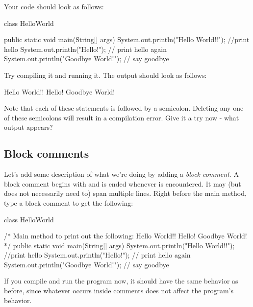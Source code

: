 Your code should look as follows:
\begin{code}
class HelloWorld {
    
    public static void main(String[] args) {
        System.out.println("Hello World!!"); //print hello
        System.out.println("Hello!"); // print hello again
        System.out.println("Goodbye World!"); // say goodbye
    }
    
}
\end{code}
Try compiling it and running it. The output should look as follows:
\begin{code}
Hello World!!
Hello!
Goodbye World!
\end{code}

Note that each of these statements is followed by a semicolon. Deleting any one of these semicolons will result in a compilation error. Give it a try now - what output appears? 

\subsection{Block comments}

Let's add some description of what we're doing by adding a \emph{block comment}. A block comment begins with \ic{/*} and is ended whenever \ic{*/} is encountered. It may (but does not necessarily need to) span multiple lines. Right before the main method, type a block comment to get the following:
\begin{code}
class HelloWorld {

    /* Main method to print out the following:
         Hello World!!
         Hello!
         Goodbye World!
    */
    public static void main(String[] args) {
        System.out.println("Hello World!!"); //print hello
        System.out.println("Hello!"); // print hello again
        System.out.println("Goodbye World!"); // say goodbye
    }

}
\end{code}
If you compile and run the program now, it should have the same behavior as before, since whatever occurs inside comments does not affect the program's behavior.


